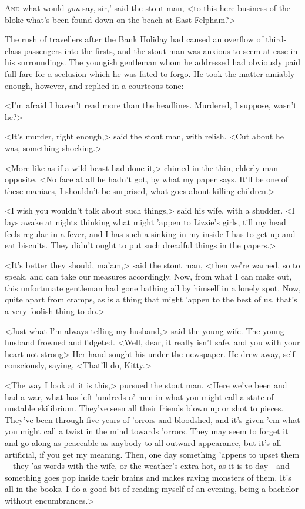 
\lettrine[ante=‘]{A}{nd} what would \textit{you} say, sir,' said the stout man, <to this here business of the bloke what's been found down on the beach at East Felpham?>

\zz
The rush of travellers after the Bank Holiday had caused an overflow of third-class passengers into the firsts, and the stout man was anxious to seem at ease in his surroundings. The youngish gentleman whom he addressed had obviously paid full fare for a seclusion which he was fated to forgo. He took the matter amiably enough, however, and replied in a courteous tone:

<I'm afraid I haven't read more than the headlines. Murdered, I suppose, wasn't he?>

<It's murder, right enough,> said the stout man, with relish. <Cut about he was, something shocking.>

<More like as if a wild beast had done it,> chimed in the thin, elderly man opposite. <No face at all he hadn't got, by what my paper says. It'll be one of these maniacs, I shouldn't be surprised, what goes about killing children.>

<I wish you wouldn't talk about such things,> said his wife, with a shudder. <I lays awake at nights thinking what might 'appen to Lizzie's girls, till my head feels regular in a fever, and I has such a sinking in my inside I has to get up and eat biscuits. They didn't ought to put such dreadful things in the papers.>

<It's better they should, ma'am,> said the stout man, <then we're warned, so to speak, and can take our measures accordingly. Now, from what I can make out, this unfortunate gentleman had gone bathing all by himself in a lonely spot. Now, quite apart from cramps, as is a thing that might 'appen to the best of us, that's a very foolish thing to do.>

<Just what I'm always telling my husband,> said the young wife. The young husband frowned and fidgeted. <Well, dear, it really isn't safe, and you with your heart not strong\longdash> Her hand sought his under the newspaper. He drew away, self-consciously, saying, <That'll do, Kitty.>

<The way I look at it is this,> pursued the stout man. <Here we've been and had a war, what has left 'undreds o' men in what you might call a state of unstable ekilibrium. They've seen all their friends blown up or shot to pieces. They've been through five years of 'orrors and bloodshed, and it's given 'em what you might call a twist in the mind towards 'orrors. They may seem to forget it and go along as peaceable as anybody to all outward appearance, but it's all artificial, if you get my meaning. Then, one day something 'appens to upset them—they 'as words with the wife, or the weather's extra hot, as it is to-day—and something goes pop inside their brains and makes raving monsters of them. It's all in the books. I do a good bit of reading myself of an evening, being a bachelor without encumbrances.>

